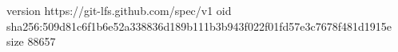 version https://git-lfs.github.com/spec/v1
oid sha256:509d81c6f1b6e52a338836d189b111b3b943f022f01fd57e3c7678f481d1915e
size 88657
